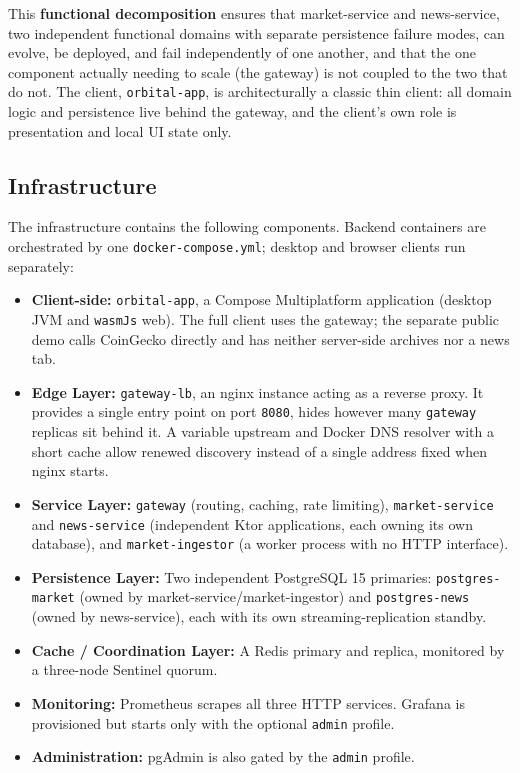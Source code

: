 \documentclass{scrartcl}
\begin{document}
This \textbf{functional decomposition} ensures that market-service and news-service, two
independent functional domains with separate persistence failure modes, can evolve, be deployed, and
fail independently of one another, and that the one component actually needing to scale (the
gateway) is not coupled to the two that do not. The client, \texttt{orbital-app}, is
architecturally a classic thin client: all domain logic and persistence live behind the gateway,
and the client's own role is presentation and local UI state only.

\subsection{Infrastructure}\label{infrastructure}

The infrastructure contains the following components. Backend containers are orchestrated by
one \texttt{docker-compose.yml}; desktop and browser clients run separately:

\begin{itemize}
  \item \textbf{Client-side:} \texttt{orbital-app}, a Compose Multiplatform application (desktop
  JVM and \texttt{wasmJs} web). The full client uses the gateway; the separate public demo calls
  CoinGecko directly and has neither server-side archives nor a news tab.
  \item \textbf{Edge Layer:} \texttt{gateway-lb}, an nginx instance acting as a reverse proxy. It
  provides a single entry point on port \texttt{8080}, hides however many \texttt{gateway}
  replicas sit behind it. A variable upstream and Docker DNS resolver with a short cache allow
  renewed discovery instead of a single address fixed when nginx starts.
  \item \textbf{Service Layer:} \texttt{gateway} (routing, caching, rate limiting),
  \texttt{market-service} and \texttt{news-service} (independent Ktor applications, each owning
  its own database), and \texttt{market-ingestor} (a worker process with no HTTP interface).
  \item \textbf{Persistence Layer:} Two independent PostgreSQL 15 primaries:
  \texttt{postgres-market} (owned by market-service/market-ingestor) and \texttt{postgres-news}
  (owned by news-service), each with its own streaming-replication standby.
  \item \textbf{Cache / Coordination Layer:} A Redis primary and replica, monitored by a
  three-node Sentinel quorum.
  \item \textbf{Monitoring:} Prometheus scrapes all three HTTP services. Grafana is provisioned
  but starts only with the optional \texttt{admin} profile.
  \item \textbf{Administration:} pgAdmin is also gated by the \texttt{admin} profile.
\end{itemize}
\end{document}
